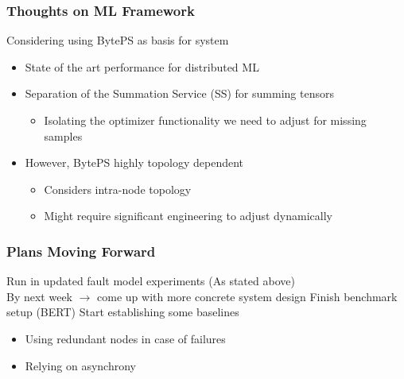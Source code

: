   \begin{frame}
    \frametitle{Thoughts on ML Framework}

    Considering using BytePS as basis for system
    \begin{itemize}
      \item State of the art performance for distributed ML
      \item Separation of the Summation Service (SS) for summing tensors
      \begin{itemize}
        \item Isolating the optimizer functionality we need to adjust for missing samples
      \end{itemize}
      \item However, BytePS highly topology dependent
      \begin{itemize}
        \item Considers intra-node topology
        \item Might require significant engineering to adjust dynamically
      \end{itemize}

    \end{itemize}
  \end{frame}

  \begin{frame}
    \frametitle{Plans Moving Forward}

    Run in updated fault model experiments (As stated above) \\
    By next week $\rightarrow$ come up with more concrete system design
    Finish benchmark setup (BERT)
    Start establishing some baselines
    \begin{itemize}
      \item Using redundant nodes in case of failures
      \item Relying on asynchrony
    \end{itemize}
  \end{frame}


